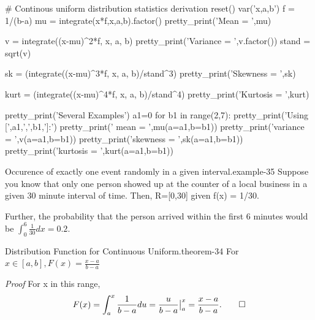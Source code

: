 \documentclass[10pt,]{book}
\makeatletter
\renewcommand*{\proofname}{Proof}
\renewenvironment{proof}[1][\proofname]{\par
  \pushQED{\qed}%
  \normalfont \topsep6\p@\@plus6\p@\relax
  \trivlist
  \item\relax
    {\itshape
    #1\@addpunct{.}}\hspace\labelsep\ignorespaces
}{%
  \popQED\endtrivlist\@endpefalse
}
\numberwithin{equation}{section}
\makeatother
\begin{document}
%
\par
\hypertarget{p-819}{}%
\leavevmode%
\begin{sageinput}
# Continous uniform distribution statistics derivation
reset()
var('x,a,b')
f = 1/(b-a)
mu = integrate(x*f,x,a,b).factor()
pretty_print('Mean = ',mu)

v = integrate((x-mu)^2*f, x, a, b)
pretty_print('Variance = ',v.factor())
stand = sqrt(v)

sk = (integrate((x-mu)^3*f, x, a, b)/stand^3)
pretty_print('Skewness =  ',sk)

kurt = (integrate((x-mu)^4*f, x, a, b)/stand^4)
pretty_print('Kurtosis = ',kurt)

pretty_print('Several Examples')
a1=0
for b1 in range(2,7):
    pretty_print('Using [',a1,',',b1,']:')
    pretty_print('    mean = ',mu(a=a1,b=b1))
    pretty_print('variance = ',v(a=a1,b=b1))
    pretty_print('skewness = ',sk(a=a1,b=b1))
    pretty_print('kurtosis = ',kurt(a=a1,b=b1))
\end{sageinput}
%
\par
\hypertarget{p-820}{}%
\begin{example}{Occurence of exactly one event randomly in a given interval.}{example-35}%
\hypertarget{p-821}{}%
Suppose you know that only one person showed up at the counter of a local business in a given 30 minute interval of time. Then, R=[0,30] given f(x) = 1/30.%
\par
\hypertarget{p-822}{}%
Further, the probability that the person arrived within the first 6 minutes would be \(\int_0^6 \frac{1}{30} dx = 0.2\).%
\end{example}
%
\par
\hypertarget{p-823}{}%
\begin{theorem}{Distribution Function for Continuous Uniform.}{}{theorem-34}%
\hypertarget{p-824}{}%
For \(x \in [a,b], F(x) = \frac{x-a}{b-a}\)%
\end{theorem}
\begin{proof}\hypertarget{proof-36}{}
\hypertarget{p-825}{}%
For x in this range,%
\begin{equation*}
F(x) = \int_a^x \frac{1}{b-a} du = \frac{u}{b-a} \big |_a^x = \frac{x-a}{b-a}.\qedhere
\end{equation*}
%
\end{proof}
%
%
%
\typeout{************************************************}
\typeout{************************************************}
%
\end{document}
